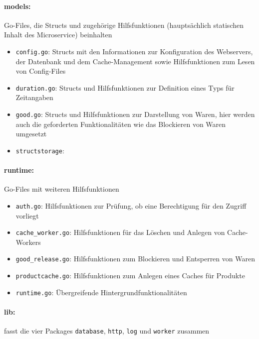\paragraph{models:} Go-Files, die Structs und zugehörige Hilfsfunktionen (hauptsächlich statischen Inhalt des Microservice) beinhalten 
	\begin{itemize}
	\item \texttt{config.go}: Structs mit den Informationen zur Konfiguration des Webservers, der Datenbank und dem Cache-Management sowie Hilfsfunktionen zum Lesen von Config-Files
	\item \texttt{duration.go}: Structs und Hilfsfunktionen zur Definition eines Typs für Zeitangaben
	\item \texttt{good.go}: Structs und Hilfsfunktionen zur Darstellung von Waren, hier werden auch die geforderten Funktionalitäten wie das Blockieren von Waren umgesetzt
	\item \texttt{structstorage}: 
	\end{itemize}


\paragraph{runtime:} Go-Files mit weiteren Hilfsfunktionen
	\begin{itemize}	
	\item \texttt{auth.go}: Hilfsfunktionen zur Prüfung, ob eine Berechtigung für den Zugriff vorliegt
	\item \texttt{cache\_worker.go}: Hilfsfunktionen für das Löschen und Anlegen von Cache-Workers
	\item \texttt{good\_release.go}: Hilfsfunktionen zum Blockieren und Entsperren von Waren
	\item \texttt{productcache.go}: Hilfsfunktionen zum Anlegen eines Caches für Produkte
	\item \texttt{runtime.go}: Übergreifende Hintergrundfunktionalitäten	
	\end{itemize}
	


\newpage
\paragraph{lib:} fasst die vier Packages \texttt{database}, \texttt{http}, \texttt{log} und \texttt{worker} zusammen

